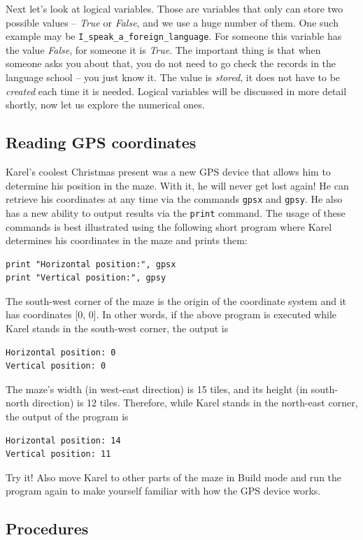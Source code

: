 \documentclass[article,A4,12pt]{llncs}
\begin{document}
{{{{Next let's look at logical variables. Those are variables that only can store two possible values --
{\em True} or {\em False}, and we use a huge number of them. One such example may be {\tt I\_speak\_a\_foreign\_language}.
For someone this variable has the value {\em False}, for someone it is {\em True}. The important 
thing is that when someone asks you about that, you do not need to go check the records in the language 
school -- you just know it. The value is {\em stored}, it does not have to be {\em created} each time 
it is needed. Logical variables will be discussed in more detail shortly, now let us explore 
the numerical ones.

\subsection{Reading GPS coordinates}

Karel's coolest Christmas present was a new GPS device that allows him to determine his position 
in the maze. With it, he will never get lost again! He can retrieve his coordinates at any time via the 
commands {\tt gpsx} and {\tt gpsy}. He also has a new ability to output results via the {\tt print} 
command. The usage of these commands is best illustrated using the following short program where 
Karel determines his coordinates in the maze and prints them:

\begin{verbatim}
print "Horizontal position:", gpsx
print "Vertical position:", gpsy
\end{verbatim}
The south-west corner of the maze is the origin of the coordinate system and it has 
coordinates [0, 0]. In other words, if the above program is executed while Karel stands 
in the south-west corner, the output is

\begin{verbatim}
Horizontal position: 0
Vertical position: 0
\end{verbatim}
The maze's width (in west-east direction) is 15 tiles, and its height (in south-north direction) 
is 12 tiles. Therefore, while Karel stands in the north-east corner, the output of the program is
\begin{verbatim}
Horizontal position: 14
Vertical position: 11
\end{verbatim}
Try it! Also move Karel to other parts of the maze in Build mode and run the program again
to make yourself familiar with how the GPS device works.

\subsection{Procedures}

}}}}
\end{document}
